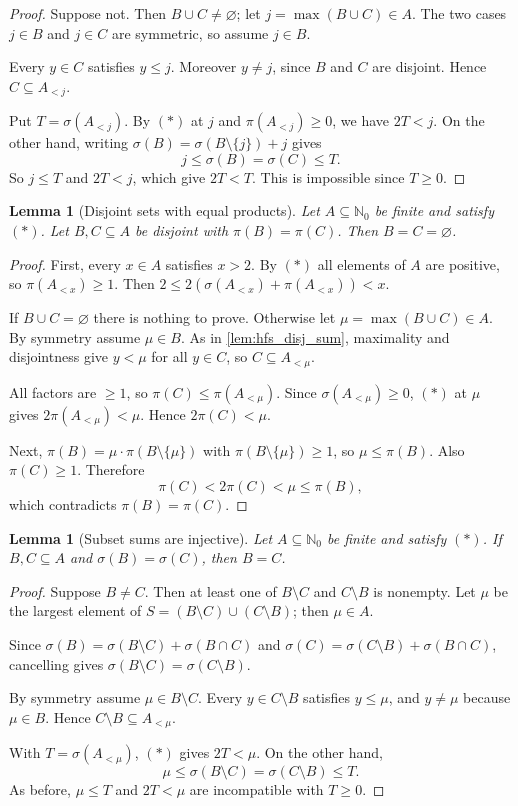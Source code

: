\documentclass[11pt]{article}
\newtheorem{lemma}[theorem]{Lemma}
\theoremstyle{definition}
\theoremstyle{remark}
\newcommand{\Nz}{\mathbb{N}_0}
\begin{document}
\begin{proof}
Suppose not. Then $B\cup C\ne\varnothing$; let $j=\max(B\cup C)\in A$. The two cases $j\in B$ and $j\in C$ are symmetric, so assume $j\in B$.

Every $y\in C$ satisfies $y\le j$. Moreover $y\neq j$, since $B$ and $C$ are disjoint. Hence $C\subseteq A_{<j}$.

Put $T=\sigma(A_{<j})$. By $(\ast)$ at $j$ and $\pi(A_{<j})\ge0$, we have $2T<j$. On the other hand, writing $\sigma(B)=\sigma(B\setminus\{j\})+j$ gives
\[
j\le\sigma(B)=\sigma(C)\le T.
\]
So $j\le T$ and $2T<j$, which give $2T<T$. This is impossible since $T\ge0$.
\end{proof}

\begin{lemma}[Disjoint sets with equal products]\label{lem:hfs_disj_prod}
Let $A\subseteq\Nz$ be finite and satisfy $(\ast)$. Let $B,C\subseteq A$ be disjoint with $\pi(B)=\pi(C)$. Then $B=C=\varnothing$.
\end{lemma}

\begin{proof}
First, every $x\in A$ satisfies $x>2$. By $(\ast)$ all elements of $A$ are positive, so $\pi(A_{<x})\ge1$. Then $2\le2(\sigma(A_{<x})+\pi(A_{<x}))<x$.

If $B\cup C=\varnothing$ there is nothing to prove. Otherwise let $\mu=\max(B\cup C)\in A$. By symmetry assume $\mu\in B$. As in \cref{lem:hfs_disj_sum}, maximality and disjointness give $y<\mu$ for all $y\in C$, so $C\subseteq A_{<\mu}$.

All factors are $\ge1$, so $\pi(C)\le\pi(A_{<\mu})$. Since $\sigma(A_{<\mu})\ge0$, $(\ast)$ at $\mu$ gives $2\pi(A_{<\mu})<\mu$. Hence $2\pi(C)<\mu$.

Next, $\pi(B)=\mu\cdot\pi(B\setminus\{\mu\})$ with $\pi(B\setminus\{\mu\})\ge1$, so $\mu\le\pi(B)$. Also $\pi(C)\ge1$. Therefore
\[
\pi(C)<2\pi(C)<\mu\le\pi(B),
\]
which contradicts $\pi(B)=\pi(C)$.
\end{proof}

\begin{lemma}[Subset sums are injective]\label{lem:hfs_sum_inj}
Let $A\subseteq\Nz$ be finite and satisfy $(\ast)$. If $B,C\subseteq A$ and $\sigma(B)=\sigma(C)$, then $B=C$.
\end{lemma}

\begin{proof}
Suppose $B\ne C$. Then at least one of $B\setminus C$ and $C\setminus B$ is nonempty. Let $\mu$ be the largest element of $S=(B\setminus C)\cup(C\setminus B)$; then $\mu\in A$.

Since $\sigma(B)=\sigma(B\setminus C)+\sigma(B\cap C)$ and $\sigma(C)=\sigma(C\setminus B)+\sigma(B\cap C)$, cancelling gives $\sigma(B\setminus C)=\sigma(C\setminus B)$.

By symmetry assume $\mu\in B\setminus C$. Every $y\in C\setminus B$ satisfies $y\le\mu$, and $y\ne\mu$ because $\mu\in B$. Hence $C\setminus B\subseteq A_{<\mu}$.

With $T=\sigma(A_{<\mu})$, $(\ast)$ gives $2T<\mu$. On the other hand,
\[
\mu\le\sigma(B\setminus C)=\sigma(C\setminus B)\le T.
\]
As before, $\mu\le T$ and $2T<\mu$ are incompatible with $T\ge0$.
\end{proof}
\end{document}
